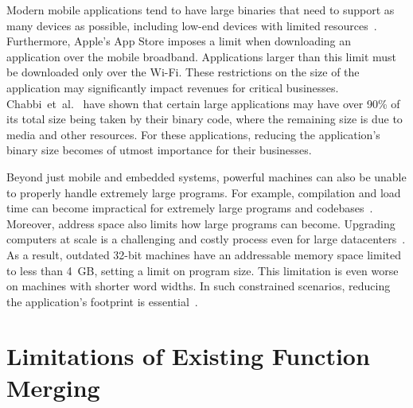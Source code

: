 Modern mobile applications tend to have large binaries that need to support as many devices as possible, including low-end devices with limited resources~\cite{hart02,etzo10}.
Furthermore, Apple's App Store imposes a limit when downloading an application over the mobile broadband.
Applications larger than this limit must be downloaded only over the Wi-Fi.
These restrictions on the size of the application may significantly impact revenues for critical businesses.
Chabbi~et~al.~\cite{chabbi21} have shown that certain large applications may have over 90\%
of its total size being taken by their binary code, where the remaining size is due to media and other resources.
For these applications, reducing the application's binary size becomes of utmost importance for their businesses.

Beyond just mobile and embedded systems, powerful machines can also be unable to properly handle extremely large programs.
For example, compilation and load time can become impractical for extremely large programs and codebases~\cite{haas17,jaspan18}.
Moreover, address space also limits how large programs can become.
Upgrading computers at scale is a challenging and costly process even for large datacenters~\cite{yan16,neamtiu11}.
As a result, outdated 32-bit machines have an addressable memory space limited to less than 4~GB, setting a limit on program size.
This limitation is even worse on machines with shorter word widths.
In such constrained scenarios, reducing the application's footprint is essential~\cite{schultz03,varma04,sehgal12,keoh14,auler17}.

\section{Limitations of Existing Function Merging}

